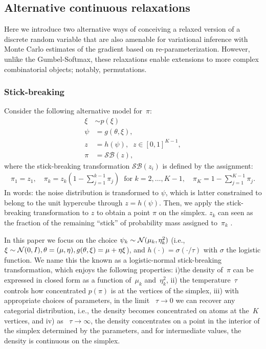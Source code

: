 \documentclass{article}
\begin{document}
\subsection{Alternative continuous relaxations}
\label{sub:alternative}
Here we introduce two alternative ways of conceiving a relaxed version of a discrete random variable that are also amenable for variational inference with Monte Carlo estimates of the gradient based on re-parameterization. However, unlike the Gumbel-Softmax, these relaxations enable extensions to more complex combinatorial objects; notably, permutations.

\subsubsection{Stick-breaking}
Consider the following alternative model for~${\pi}$:
\begin{align}
  \xi &\sim p(\xi) \\
  \psi & = g(\theta, \xi),  \\
  z &  = h(\psi), \;\; z\in[0,1]^{K-1}, \\ 
   {\pi} &=\mathcal{SB}(z), 
  \end{align}
 where the stick-breaking transformation $\mathcal{SB}(z_i)$ is defined by the assignment:
\begin{align} {\pi}_1 =z_1, \quad {\pi}_k = z_k \left(1- \sum_{j=1}^{k-1} {\pi}_j\right) \;\; \text{for } k=2, \ldots, K-1,  \quad {\pi}_K = 1- \sum_{j=1}^{K-1} {\pi}_j. 
\end{align}
In words: the noise distribution is transformed to $\psi$, which is latter constrained to belong to the unit hypercube through $z = h(\psi)$. Then, we apply the stick-breaking transformation to $z$ to obtain a point $\pi$ on the simplex. $z_k$ can seen as the fraction of the remaining ``stick'' of probability mass assigned to~${\pi}_k$ \citep{linderman2015dependent}.


In this paper we focus on the choice $\psi_k \sim \mathcal{N}(\mu_k, \eta_k^2) $ (i.e., $\xi\sim\mathcal{N}(0,I), \theta = (\mu,\eta), g(\theta, \xi) = \mu + \eta \xi$), and $h(\cdot) = \sigma(\cdot /\tau)$ with $\sigma$ the logistic function. We name this the known as a logistic-normal stick-breaking transformation, which enjoys the following properties: i)the density of~${\pi}$ can be expressed in closed form as a function of~$\mu_k$ and~$\eta_k^2$, ii) the temperature~$\tau$ controls how
concentrated $p(\pi)$ is at the vertices of the simplex, iii) with appropriate choices of parameters, in the limit ~$\tau \to 0$ we can recover any categorial distribution, i.e., the density becomes concentrated on atoms at the~$K$ vertices, and iv) as ~$\tau \to \infty$, the density concentrates on a point in the interior of the simplex determined by the parameters, and for intermediate values, the density is
continuous on the simplex. 
\end{document}
